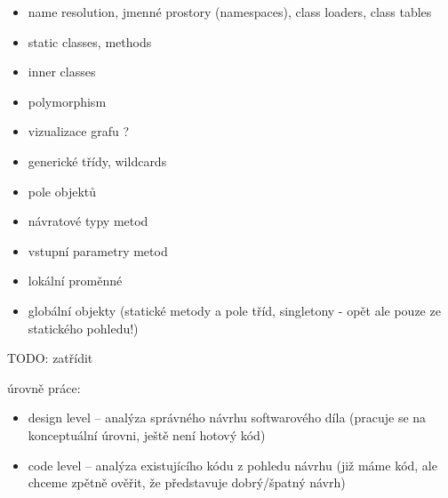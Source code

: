 \begin{itemize}
\item name resolution, jmenné prostory (namespaces), class loaders, class tables
\item static classes, methods
\item inner classes
\item polymorphism
\item vizualizace grafu ?
\item generické třídy, wildcards
\item pole objektů
\item návratové typy metod
\item vstupní parametry metod
\item lokální proměnné
\item globální objekty (statické metody a pole tříd, singletony - opět ale pouze ze statického pohledu!)
\end{itemize}

TODO: zatřídit

úrovně práce:

\begin{itemize}
\item design level -- analýza správného návrhu softwarového díla (pracuje se na konceptuální úrovni, ještě není hotový kód)
\item code level -- analýza existujícího kódu z pohledu návrhu (již máme kód, ale chceme zpětně ověřit, že představuje dobrý/špatný návrh)
\end{itemize}
